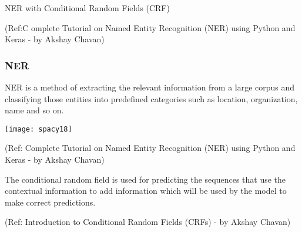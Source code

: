 \begin{frame}[fragile]\frametitle{}

\begin{center}
{\Large NER with Conditional Random Fields (CRF)}

{\tiny (Ref:C omplete Tutorial on Named Entity Recognition (NER) using Python and Keras - by Akshay Chavan)}
\end{center}


\end{frame}


\begin{frame}[fragile]\frametitle{NER}
NER is a method of extracting the relevant information from a large corpus and classifying those entities into predefined categories such as location, organization, name and so on. 
	
\begin{center}
\texttt{[image: spacy18]}

	{\tiny (Ref: Complete Tutorial on Named Entity Recognition (NER) using Python and Keras - by Akshay Chavan)}

\end{center}

The conditional random field is used for predicting the sequences that use the contextual information to add information which will be used by the model to make correct predictions.

	{\tiny (Ref: Introduction to Conditional Random Fields (CRFs) - by Akshay Chavan)}

\end{frame}

